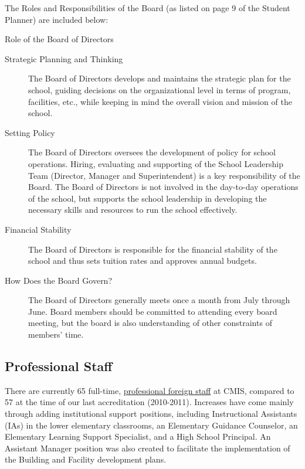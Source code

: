 The Roles and Responsibilities of the Board (as listed on page 9 of the Student Planner) are included below:

Role of the Board of Directors
\begin{description}
\item [Strategic Planning and Thinking] The Board of Directors develops and maintains the strategic plan for the school, guiding decisions on the organizational level in terms of program, facilities, etc., while keeping in mind the overall vision and mission of the school.
\item [Setting Policy] The Board of Directors oversees the development of policy for school operations. Hiring, evaluating and supporting of the School Leadership Team (Director, Manager and Superintendent) is a key responsibility of the Board. The Board of Directors is not involved in the day-to-day operations of the school, but supports the school leadership in developing the necessary skills and resources to run the school effectively.
\item [Financial Stability] The Board of Directors is responsible for the financial stability of the school and thus sets tuition rates and approves annual budgets.
\item [How Does the Board Govern?] The Board of Directors generally meets once a month from July through June.  Board members should be committed to attending every board meeting, but the board is also understanding of other constraints of members’ time.
\end{description}

\subsection{Professional Staff}

There are currently 65 full-time, \href{http://cmis.ac.th/about/faculty}{professional foreign staff} at CMIS, compared to 57 at the time of our last accreditation (2010-2011).  Increases have come mainly through adding institutional support positions, including Instructional Assistants (IAs) in the lower elementary classrooms, an Elementary Guidance Counselor, an Elementary Learning Support Specialist, and a High School Principal.  An Assistant Manager position was also created to facilitate the implementation of the Building and Facility development plans.  


